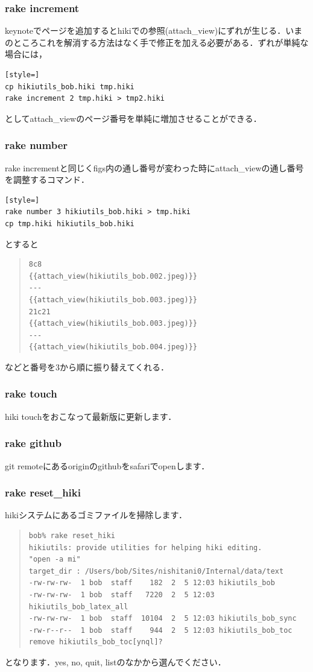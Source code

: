 \subsubsection{rake increment}
keynoteでページを追加するとhikiでの参照(attach\_view)にずれが生じる．いまのところこれを解消する方法はなく手で修正を加える必要がある．ずれが単純な場合には，
\begin{lstlisting}[style=]
cp hikiutils_bob.hiki tmp.hiki
rake increment 2 tmp.hiki > tmp2.hiki
\end{lstlisting}
としてattach\_viewのページ番号を単純に増加させることができる．

\subsubsection{rake number}
rake incrementと同じくfigs内の通し番号が変わった時にattach\_viewの通し番号を調整するコマンド．
\begin{lstlisting}[style=]
rake number 3 hikiutils_bob.hiki > tmp.hiki
cp tmp.hiki hikiutils_bob.hiki
\end{lstlisting}
とすると
\begin{quote}\begin{verbatim}
8c8
{{attach_view(hikiutils_bob.002.jpeg)}}
---
{{attach_view(hikiutils_bob.003.jpeg)}}
21c21
{{attach_view(hikiutils_bob.003.jpeg)}}
---
{{attach_view(hikiutils_bob.004.jpeg)}}
\end{verbatim}\end{quote}
などと番号を3から順に振り替えてくれる．

\subsubsection{rake touch}
hiki touchをおこなって最新版に更新します．

\subsubsection{rake github}
git remoteにあるoriginのgithubをsafariでopenします．

\subsubsection{rake reset\_hiki}
hikiシステムにあるゴミファイルを掃除します．
\begin{quote}\begin{verbatim}
bob% rake reset_hiki
hikiutils: provide utilities for helping hiki editing.
"open -a mi"
target_dir : /Users/bob/Sites/nishitani0/Internal/data/text
-rw-rw-rw-  1 bob  staff    182  2  5 12:03 hikiutils_bob
-rw-rw-rw-  1 bob  staff   7220  2  5 12:03 hikiutils_bob_latex_all
-rw-rw-rw-  1 bob  staff  10104  2  5 12:03 hikiutils_bob_sync
-rw-r--r--  1 bob  staff    944  2  5 12:03 hikiutils_bob_toc
remove hikiutils_bob_toc[ynql]?
\end{verbatim}\end{quote}
となります．yes, no, quit, listのなかから選んでください．

